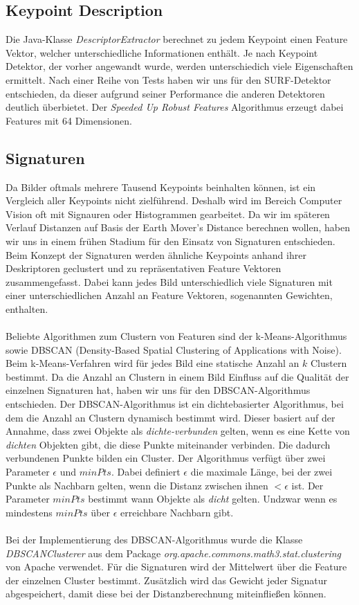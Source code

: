\documentclass{scrartcl}
\begin{document}
\subsection{Keypoint Description}
Die Java-Klasse \textit{DescriptorExtractor} berechnet zu jedem Keypoint einen Feature Vektor, welcher unterschiedliche Informationen enthält. Je nach Keypoint Detektor, der vorher angewandt wurde, werden unterschiedich viele Eigenschaften ermittelt. Nach einer Reihe von Tests haben wir uns für den SURF-Detektor entschieden, da dieser aufgrund seiner Performance die anderen Detektoren deutlich überbietet. Der \textit{Speeded Up Robust Features} Algorithmus erzeugt dabei Features mit 64 Dimensionen. 

\subsection{Signaturen}
Da Bilder oftmals mehrere Tausend Keypoints beinhalten können, ist ein Vergleich aller Keypoints nicht zielführend. Deshalb wird im Bereich Computer Vision oft mit Signauren oder Histogrammen gearbeitet. Da wir im späteren Verlauf Distanzen auf Basis der Earth Mover's Distance berechnen wollen, haben wir uns in einem frühen Stadium für den Einsatz von Signaturen entschieden. Beim Konzept der Signaturen werden ähnliche Keypoints anhand ihrer Deskriptoren geclustert und zu repräsentativen Feature Vektoren zusammengefasst. Dabei kann jedes Bild unterschiedlich viele Signaturen mit einer unterschiedlichen Anzahl an Feature Vektoren, sogenannten Gewichten, enthalten.
\\
\\
Beliebte Algorithmen zum Clustern von Featuren sind der k-Means-Algorithmus sowie DBSCAN (Density-Based Spatial Clustering of Applications with Noise). Beim k-Means-Verfahren wird für jedes Bild eine statische Anzahl an $k$ Clustern bestimmt. Da die Anzahl an Clustern in einem Bild Einfluss auf die Qualität der einzelnen Signaturen hat, haben wir uns für den DBSCAN-Algorithmus entschieden.  Der DBSCAN-Algorithmus ist ein dichtebasierter Algorithmus, bei dem die Anzahl an Clustern dynamisch bestimmt wird. Dieser basiert auf der Annahme, dass zwei Objekte als \textit{dichte-verbunden} gelten, wenn es eine Kette von \textit{dichten} Objekten gibt, die diese Punkte miteinander verbinden. Die dadurch verbundenen Punkte bilden ein Cluster. Der Algorithmus verfügt über zwei Parameter $\epsilon$ und $minPts$. Dabei definiert $\epsilon$ die maximale Länge, bei der zwei Punkte als Nachbarn gelten, wenn die Distanz zwischen ihnen  $< \epsilon$ ist. Der Parameter $minPts$  bestimmt wann Objekte als \textit{dicht} gelten. Undzwar wenn es mindestens $minPts$ über $\epsilon$ erreichbare Nachbarn gibt.
\\
\\
Bei der Implementierung des DBSCAN-Algorithmus wurde die Klasse \textit{DBSCANClusterer} aus dem Package \textit{org.apache.commons.math3.stat.clustering} von Apache verwendet. Für die Signaturen wird der Mittelwert über die Feature der einzelnen Cluster bestimmt. Zusätzlich wird das Gewicht jeder Signatur abgespeichert, damit diese bei der Distanzberechnung miteinfließen können.
\end{document}
